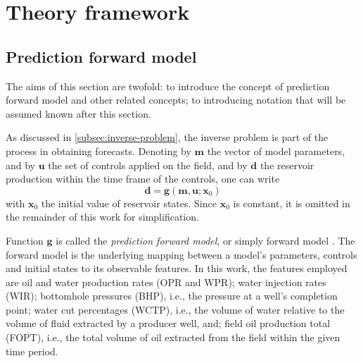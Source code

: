 \chapter{Theory framework}
\label{chap:theory-framework}


\section{Prediction forward model}
\label{sec:forward-model}
The aims of this section are twofold:
to introduce the concept of prediction forward model and other related concepts;
to introducing notation that will be assumed known after this section.

As discussed in \cref{subsec:inverse-problem}, 
the inverse problem is part of the process in obtaining forecasts.
%
Denoting by $\mathbf{m}$ the vector of model parameters,
and by $\mathbf{u}$ the set of controls applied on the field,
and by $\mathbf{d}$ the reservoir production within the time frame of the controls,
one can write
%
\begin{equation}
    \mathbf{d} = \mathbf{g}(\mathbf{m}, \mathbf{u}; \mathbf{x}_0)
\label{eq:prediction-forward-model}
\end{equation} 
%
with $\mathbf{x}_0$ the initial value of reservoir states.
Since $\mathbf{x}_0$ is constant, it is omitted in the remainder of this work for simplification.

Function $\mathbf{g}$ is called the \emph{prediction forward model}, or simply forward model
\cite[section 1.4]{Emerick:2025}.
%
The forward model is the underlying mapping between a 
model's parameters, controls and initial states to its observable features.
%
In this work, the features employed are 
oil and water production rates (OPR and WPR);
water injection rates (WIR);
bottomhole pressures (BHP), i.e., the pressure at a well's completion point;
water cut percentages (WCTP), i.e., the volume of water relative to the volume of fluid extracted by a producer well, and;
field oil production total (FOPT), i.e., the total volume of oil extracted from the field within the given time period.


